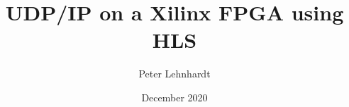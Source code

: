 



\title{UDP/IP on a Xilinx FPGA using HLS}
\author{Peter Lehnhardt}
\date{December 2020}
\maketitle



\clearpage
\tableofcontents

\clearpage

\clearpage

\clearpage


\clearpage
\appendix

\clearpage
\listoflistings
\listoffigures
\listoftables

\clearpage
{}



